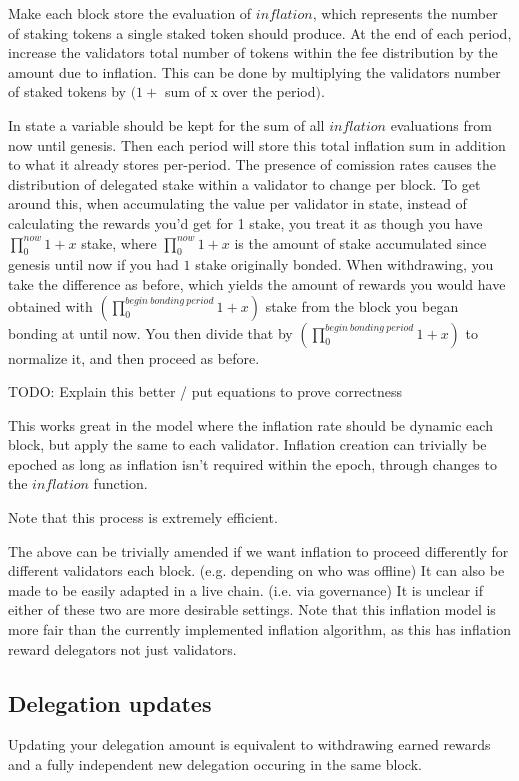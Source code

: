 \documentclass[]{article}
\begin{document}
Make each block store the evaluation of $inflation$, which represents the number of staking tokens a single staked token should produce. 
At the end of each period, increase the validators total number of tokens within the fee distribution by the amount due to inflation. This can be done by multiplying the validators number of staked tokens by $(1 + $ sum of x over the period$)$.

In state a variable should be kept for the sum of all $inflation$ evaluations from now until genesis.
Then each period will store this total inflation sum in addition to what it already stores per-period.
The presence of comission rates causes the distribution of delegated stake within a validator to change per block.
To get around this, when accumulating the value per validator in state, instead of calculating the rewards you'd get for 1 stake, you treat it as though you have $\prod_0^{now} 1 + x$ stake, where $\prod_0^{now} 1 + x$ is the amount of stake accumulated since genesis until now if you had $1$ stake originally bonded.
When withdrawing, you take the difference as before, which yields the amount of rewards you would have obtained with $(\prod_0^{begin\ bonding\ period}1 + x)$ stake from the block you began bonding at until now. You then divide that by $(\prod_0^{begin\ bonding\ period}1 + x)$ to normalize it, and then proceed as before.

TODO: Explain this better / put equations to prove correctness

This works great in the model where the inflation rate should be dynamic each block, but apply the same to each validator.
Inflation creation can trivially be epoched as long as inflation isn't required within the epoch, through changes to the $inflation$ function.

Note that this process is extremely efficient.

The above can be trivially amended if we want inflation to proceed differently for different validators each block.
(e.g. depending on who was offline) It can also be made to be easily adapted in a live chain. (i.e. via governance) 
It is unclear if either of these two are more desirable settings.
Note that this inflation model is more fair than the currently implemented inflation algorithm, as this has inflation reward delegators not just validators.

\subsection{Delegation updates}
Updating your delegation amount is equivalent to withdrawing earned rewards and a fully independent new delegation occuring in the same block.
\end{document}
